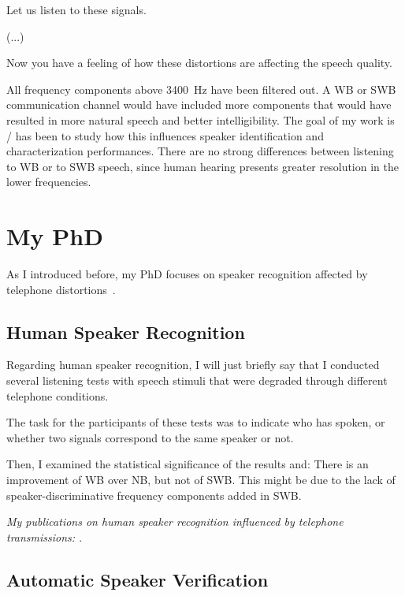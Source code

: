 \documentclass[a4paper]{article}
\begin{document}
Let us listen to these signals.

(...)

Now you have a feeling of how these distortions are affecting the speech quality.

All frequency components above 3400~Hz have been filtered out. A WB or SWB communication channel would have included more components that would have resulted in more natural speech and better intelligibility. The goal of my work is / has been to study how this influences speaker identification and characterization performances. There are no strong differences between listening to WB or to SWB speech, since human hearing presents greater resolution in the lower frequencies.



\section{My PhD}

As I introduced before, my PhD focuses on speaker recognition affected by telephone distortions~\cite{my5}.

\subsection{Human Speaker Recognition}

Regarding human speaker recognition, I will just briefly say that I conducted several listening tests with speech stimuli that were degraded through different telephone conditions. 

The task for the participants of these tests was to indicate who has spoken, or whether two signals correspond to the same speaker or not.

Then, I examined the statistical significance of the results and: There is an improvement of WB over NB, but not of SWB. This might be due to the lack of speaker-discriminative frequency components added in SWB.

\textit{My publications on human speaker recognition influenced by telephone transmissions: \cite{my1, my3, my4}}.

\subsection{Automatic Speaker Verification}
\end{document}

